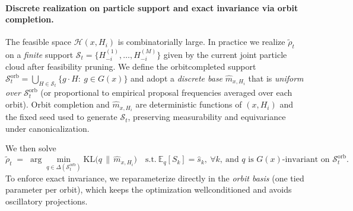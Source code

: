\documentclass[10pt]{article}
\newcommand{\E}{\mathbb{E}}
\newcommand{\KL}{\mathrm{KL}}
\newcommand{\1}{\mathbf{1}}
\theoremstyle{plain}
\begin{document}
\paragraph{Discrete realization on particle support and exact invariance via orbit completion.}
The feasible space $\mathcal{H}(x,H_i)$ is combinatorially large. In practice we realize $\tilde\rho_t$ on a \emph{finite} support $\mathcal{S}_t=\{H^{(1)}_{-i},\ldots,H^{(M)}_{-i}\}$ given by the current joint particle cloud after feasibility pruning. We define the orbit\textendash completed support $\mathcal{S}_t^{\text{orb}}=\bigcup_{H\in\mathcal{S}_t}\{g\!\cdot\!H:\ g\in G(x)\}$ and adopt a \emph{discrete base} $\hat m_{x,H_i}$ that is \emph{uniform over $\mathcal{S}_t^{\text{orb}}$} (or proportional to empirical proposal frequencies averaged over each orbit). Orbit completion and $\hat m_{x,H_i}$ are deterministic functions of $(x,H_i)$ and the fixed seed used to generate $\mathcal{S}_t$, preserving measurability and equivariance under canonicalization.

We then solve
\[
\tilde\rho_t \;=\; \arg\min_{q\in \Delta(\mathcal{S}_t^{\text{orb}})} \KL\!\big(q\,\|\,\hat m_{x,H_i}\big)\quad\text{s.t.}\ \E_q[S_k]=\widehat s_k,\ \forall k,\ \text{and }q\text{ is }G(x)\text{-invariant on }\mathcal{S}_t^{\text{orb}}.
\]
To enforce exact invariance, we reparameterize directly in the \emph{orbit basis} (one tied parameter per orbit), which keeps the optimization well\textendash conditioned and avoids oscillatory projections.
\end{document}
